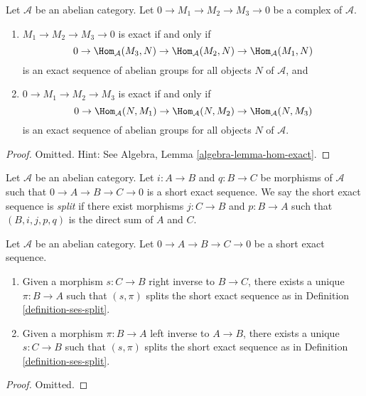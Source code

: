\begin{lemma}
\label{lemma-check-exactness}
Let $\mathcal{A}$ be an abelian category.
Let $0 \to M_1 \to M_2 \to M_3 \to 0$ be a complex of $\mathcal{A}$.
\begin{enumerate}
\item $M_1 \to M_2 \to M_3 \to 0$ is exact if and only if
$$
0 \to \Hom_\mathcal{A}(M_3, N) \to
\Hom_\mathcal{A}(M_2, N) \to \Hom_\mathcal{A}(M_1, N)
$$
is an exact sequence of abelian groups for all objects $N$ of
$\mathcal{A}$, and
\item $0 \to M_1 \to M_2 \to M_3$ is exact if and only if
$$
0 \to \Hom_\mathcal{A}(N, M_1) \to \Hom_\mathcal{A}(N, M_2) \to
\Hom_\mathcal{A}(N, M_3)
$$
is an exact sequence of abelian groups for all objects $N$ of $\mathcal{A}$.
\end{enumerate}
\end{lemma}

\begin{proof}
Omitted. Hint: See
Algebra, Lemma \ref{algebra-lemma-hom-exact}.
\end{proof}

\begin{definition}
\label{definition-ses-split}
Let $\mathcal{A}$ be an abelian category.
Let $i : A \to B$ and $q : B \to C$ be morphisms
of $\mathcal{A}$ such that
$0 \to A \to B \to C \to 0$ is a short
exact sequence. We say the short exact
sequence is {\it split} if there exist
morphisms $j : C \to B$ and $p : B \to A$ such
that $(B, i, j, p, q)$ is the direct sum of $A$ and $C$.
\end{definition}

\begin{lemma}
\label{lemma-ses-split}
Let $\mathcal{A}$ be an abelian category.
Let $0 \to A \to B \to C \to 0$
be a short exact sequence.
\begin{enumerate}
\item Given a morphism $s : C \to B$ right inverse to
$B \to C$, there exists a unique $\pi : B \to A$
such that $(s, \pi)$ splits the short exact sequence
as in Definition \ref{definition-ses-split}.
\item Given a morphism $\pi : B \to A$ left inverse to
$A \to B$, there exists a unique $s : C \to B$
such that $(s, \pi)$ splits the short exact sequence
as in Definition \ref{definition-ses-split}.
\end{enumerate}
\end{lemma}

\begin{proof}
Omitted.
\end{proof}

